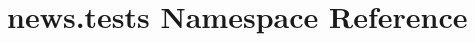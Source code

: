 \hypertarget{namespacenews_1_1tests}{}\section{news.\+tests Namespace Reference}
\label{namespacenews_1_1tests}
